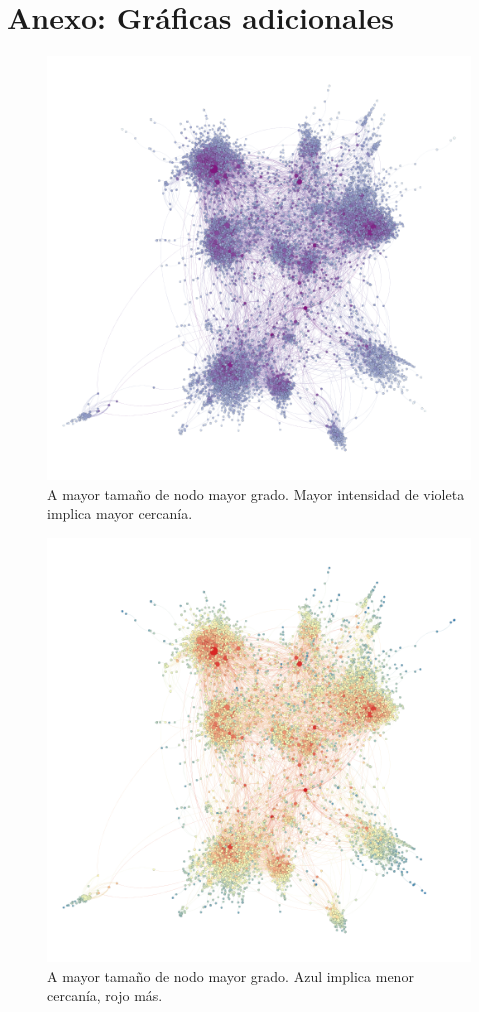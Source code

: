 \section{Anexo: Gráficas adicionales}

\begin{figure}[ht]
    \centerfloat
    \includegraphics[width=1.3\textwidth]{img/resultados/grado-cercania.png}
    \caption{A mayor tamaño de nodo mayor grado. Mayor intensidad de violeta implica mayor cercanía.}
\end{figure}

\begin{figure}[ht]
    \centerfloat
    \includegraphics[width=1.3\textwidth]{img/resultados/grado-cercania2.png}
    \caption{A mayor tamaño de nodo mayor grado. Azul implica menor cercanía, rojo más.}
\end{figure}

